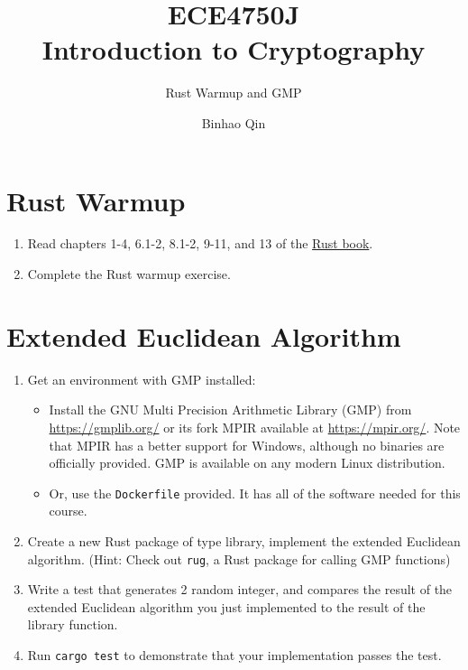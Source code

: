 \documentclass[11pt,a4paper]{article}
\title{ECE4750J\\ Introduction to Cryptography}
\subtitle{Rust Warmup and GMP}
\author{Binhao Qin}
\begin{document}
\maketitle
\section{Rust Warmup}
\begin{enumerate}
	\item Read chapters 1-4, 6.1-2, 8.1-2, 9-11, and 13 of the \href{https://doc.rust-lang.org/book/}{Rust book}.
	\item Complete the Rust warmup exercise.
\end{enumerate}
\section{Extended Euclidean Algorithm}
\begin{enumerate}
	\item Get an environment with GMP installed:
	\begin{itemize}
		\item Install the GNU Multi Precision Arithmetic Library (GMP) from \href{https://gmplib.org/}{https://gmplib.org/} or its fork MPIR available at \href{https://mpir.org/}{https://mpir.org/}. Note that MPIR has a better support for Windows, although no binaries are officially provided. GMP is available on any modern Linux distribution.
		\item Or, use the \texttt{Dockerfile} provided. It has all of the software needed for this course.
	\end{itemize}
	\item Create a new Rust package of type library, implement the extended Euclidean algorithm. (Hint: Check out \texttt{rug}, a Rust package for calling GMP functions)
	\item Write a test that generates 2 random integer, and compares the result of the extended Euclidean algorithm you just implemented to the result of the library function.
	\item Run \texttt{cargo test} to demonstrate that your implementation passes the test.
\end{enumerate}
\end{document}
